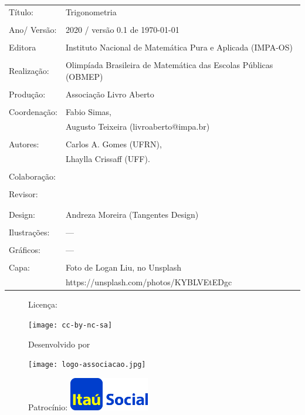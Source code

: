\begin{tabular}{p{}p{}}
Título: & Trigonometria\\
\\
Ano/ Versão: & 2020 / versão 0.1 de \today\\
\\
Editora & Instituto Nacional de Matem\'atica Pura e Aplicada (IMPA-OS)\\
\\
Realização:& Olimp\'iada Brasileira de Matem\'atica das Escolas P\'ublicas (OBMEP)\\
\\
Produção:& Associação Livro Aberto\\
\\
Coordenação: & Fabio Simas, \\
			&  Augusto Teixeira (livroaberto@impa.br)\\
\\
  Autores: & Carlos A. Gomes (UFRN),\\
             & Lhaylla Crissaff (UFF).\\
        
\\
Colaboração: & \\
\\
Revisor: &  \\
         &  \\
\\
Design: & Andreza Moreira (Tangentes Design) \\
\\
  Ilustrações: & --- \\ 
\\
Gráficos: & ---\\
\\
  Capa: & Foto de Logan Liu, no Unsplash \\
  		& https://unsplash.com/photos/KYBLVEtEDgc \\

\end{tabular}
\vspace{.5cm}



\begin{figure}[b]
\begin{minipage}[l]{5cm}
\centering

{\large Licença:}

  \texttt{[image: cc-by-nc-sa]}
\end{minipage}\hfill
\begin{minipage}[c]{5cm}
\centering
{\large Desenvolvido por}

\texttt{[image: logo-associacao.jpg]}
\end{minipage}
\begin{minipage}[r]{5cm}
\centering

{\large Patrocínio:}
  \vspace{1em}
  \includegraphics[width=3.5cm]{itau}
\end{minipage}
\end{figure}

